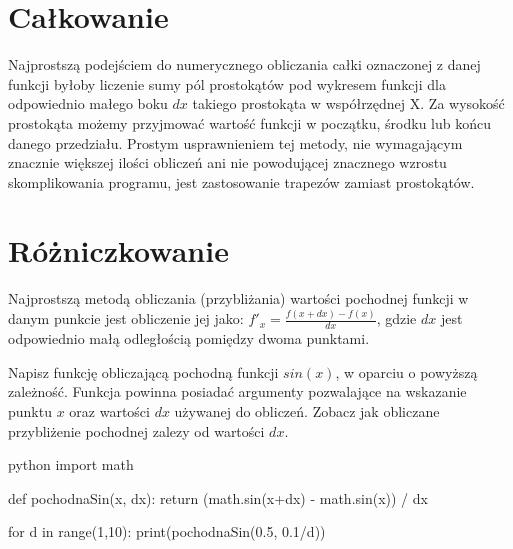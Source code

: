 \documentclass{pdfBooklets}
\begin{document}
\section{Całkowanie}

Najprostszą podejściem do numerycznego obliczania całki oznaczonej z danej funkcji byłoby liczenie sumy pól prostokątów pod wykresem funkcji dla odpowiednio małego boku $dx$ takiego prostokąta w współrzędnej X.
Za wysokość prostokąta możemy przyjmować wartość funkcji w początku, środku lub końcu danego przedziału.
Prostym usprawnieniem tej metody, nie wymagającym znacznie większej ilości obliczeń ani nie powodującej znacznego wzrostu skomplikowania programu, jest zastosowanie trapezów zamiast prostokątów.


\section{Różniczkowanie}

Najprostszą metodą obliczania (przybliżania) wartości pochodnej funkcji w danym punkcie jest obliczenie jej jako: $f'_x=  \frac{f(x+dx) - f(x)}{dx}$, gdzie $dx$ jest odpowiednio małą odległością pomiędzy dwoma punktami.

\begin{Zadanie}{}{}
Napisz funkcję obliczającą pochodną funkcji $sin(x)$, w oparciu o powyższą zależność. Funkcja powinna posiadać argumenty pozwalające na wskazanie punktu $x$ oraz wartości $dx$ używanej do obliczeń. Zobacz jak obliczane przybliżenie pochodnej zalezy od wartości $dx$.

\begin{rozwiazanie}{python}
import math

def pochodnaSin(x, dx):
	return (math.sin(x+dx) - math.sin(x)) / dx

for d in range(1,10):
	print(pochodnaSin(0.5, 0.1/d))
\end{rozwiazanie}
\end{Zadanie}
\end{document}
